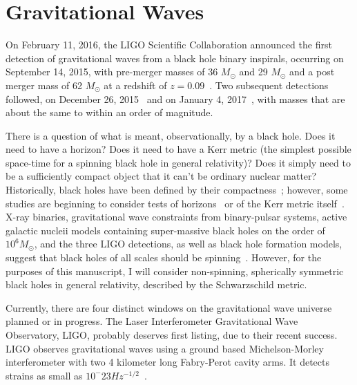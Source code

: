 \section{Gravitational Waves}

On February 11, 2016, the LIGO Scientific Collaboration announced the
first detection of gravitational waves from a black hole binary
inspirals, occurring on September 14, 2015, with pre-merger masses of
36 $M_\odot$ and 29 $M_\odot$ and a post merger mass of 62 $M_\odot$
at a redshift of $z=0.09$~\cite{GW150914}. Two subsequent detections
followed, on December 26, 2015~\cite{GW151226} and on January 4,
2017~\cite{GW170104}, with masses that are about the same to within an order of magnitude.

There is a question of what is meant, observationally, by a black hole. Does it need to have a horizon? Does it need to have a Kerr metric (the simplest possible space-time for a spinning black hole in general relativity)? Does it simply need to be a sufficiently compact object that it can't be ordinary nuclear matter? Historically, black holes have been defined by their compactness~\cite{Bambi2017}; however, some studies are beginning to consider tests of horizons~\cite{} or of the Kerr metric itself~\cite{Bambi2017}. X-ray binaries, gravitational wave constraints from binary-pulsar systems, active galactic nucleii models containing super-massive black holes on the order of $10^6 M_\odot$, and the three LIGO detections, as well as black hole formation models, suggest that black holes of all scales should be spinning~\cite{Bambi2017}. However, for the purposes of this manuscript, I will consider non-spinning, spherically symmetric black holes in general relativity, described by the Schwarzschild metric.

Currently, there are four distinct windows on the gravitational wave universe planned or in progress. The Laser Interferometer Gravitational Wave Observatory, LIGO, probably deserves first listing, due to their recent success. LIGO observes gravitational waves using a ground based Michelson-Morley interferometer with two 4 kilometer long Fabry-Perot cavity arms. It detects strains as small as $10^-{23} Hz^{-1/2}$~\cite{LIGOsensitivity}.







